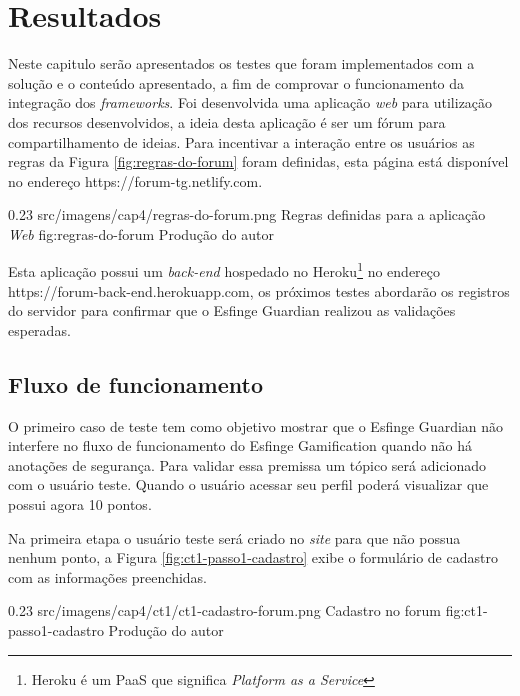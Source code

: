 \newpage
\chapter{Resultados}
Neste capitulo serão apresentados os testes que foram implementados com a solução e o conteúdo apresentado, a fim de comprovar o funcionamento da integração dos \textit{frameworks}. Foi desenvolvida uma aplicação \textit{web} para utilização dos recursos desenvolvidos, a ideia desta aplicação é ser um fórum para compartilhamento de ideias. Para incentivar a interação entre os usuários as regras da Figura \ref{fig:regras-do-forum} foram definidas, esta página está disponível no endereço https://forum-tg.netlify.com.

\begin{image}
{0.23}
{src/imagens/cap4/regras-do-forum.png}
{Regras definidas para a aplicação \textit{Web}}
{fig:regras-do-forum}
{Produção do autor}
\end{image}

\par Esta aplicação possui um \textit{back-end} hospedado no Heroku\footnote{Heroku é um PaaS que significa \textit{Platform as a Service}} no endereço https://forum-back-end.herokuapp.com, os próximos testes abordarão os registros do servidor para confirmar que o Esfinge Guardian realizou as validações esperadas.

\section{Fluxo de funcionamento}

\par O primeiro caso de teste tem como objetivo mostrar que o Esfinge Guardian não interfere no fluxo de funcionamento do Esfinge Gamification quando não há anotações de segurança. Para validar essa premissa um tópico será adicionado com o usuário teste. Quando o usuário acessar seu perfil poderá visualizar que possui agora 10 pontos.

\par Na primeira etapa o usuário teste será criado no \textit{site} para que não possua nenhum ponto, a Figura \ref{fig:ct1-passo1-cadastro} exibe o formulário de cadastro com as informações preenchidas.

\begin{image}
{0.23}
{src/imagens/cap4/ct1/ct1-cadastro-forum.png}
{Cadastro no forum}
{fig:ct1-passo1-cadastro}
{Produção do autor}
\end{image}

